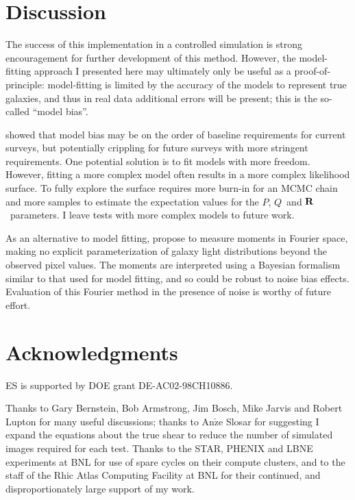 \documentclass[usegraphicx,usenatbib]{mn2e}
\newcommand{\vecQ}{\mbox{\boldmath $Q$}}
\newcommand{\matR}{\mbox{$\bf R$}}
\begin{document}
\section{Discussion} \label{sec:summary}

The success of this implementation in a controlled simulation is strong
encouragement for further development of this method.  However, the
model-fitting approach I presented here may ultimately only be useful as a
proof-of-principle: model-fitting is limited by the accuracy of the models to
represent true galaxies, and thus in real data additional errors will be
present; this is the so-called ``model bias''.  

\cite{Kacprzak13} showed that model bias may be on the order of baseline
requirements for current surveys, but potentially crippling for future surveys
with more stringent requirements. One potential solution is to fit models with
more freedom.  However, fitting a more complex model often results in a more
complex likelihood surface. To fully explore the surface requires more burn-in
for an MCMC chain and more samples to estimate the expectation values for the
$P$, \vecQ\ and \matR\ parameters.  I leave tests with more complex models to
future work.

As an alternative to model fitting, \cite{ba14} propose to measure moments in
Fourier space, making no explicit parameterization of galaxy light
distributions beyond the observed pixel values.  The moments are interpreted
using a Bayesian formalism similar to that used for model fitting, and so could
be robust to noise bias effects.  Evaluation of this Fourier method in the
presence of noise is worthy of future effort.

\section*{Acknowledgments}

ES is supported by DOE grant DE-AC02-98CH10886.

Thanks to Gary Bernstein, Bob Armstrong, Jim Bosch, Mike Jarvis and Robert
Lupton for many useful discussions; thanks to An$\check{\textrm{z}}$e Slosar
for suggesting I expand the equations about the true shear to reduce the number
of simulated images required for each test.  Thanks to the STAR, PHENIX and
LBNE experiments at BNL for use of spare cycles on their compute clusters, and
to the staff of the Rhic Atlas Computing Facility at BNL for their continued,
and disproportionately large support of my work.




\end{document}
